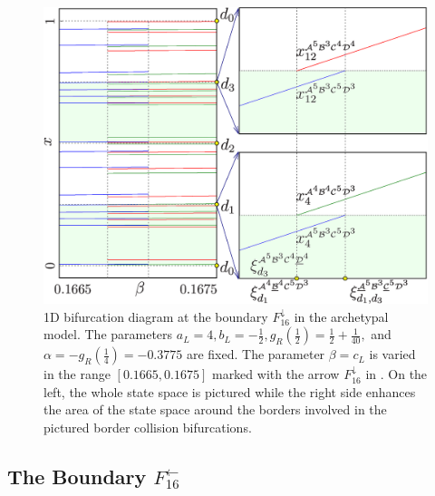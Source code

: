 \begin{figure}[H]
	\centering
	\includegraphics[width=.7 \textwidth]{../Figures/6/6.5/result.png}
	\caption[1D bifurcation diagram at the boundary $F_{16}^\downarrow$ in the archetypal model]{
		1D bifurcation diagram at the boundary $F_{16}^\downarrow$ in the archetypal model.
		The parameters $a_L = 4, b_L = -\frac{1}{2}, g_R\left(\frac{1}{2}\right) = \frac{1}{2} + \frac{1}{40},$ and $\alpha = -g_R\left(\frac{1}{4}\right) = -0.3775$ are fixed.
		The parameter $\beta = c_L$ is varied in the range $[0.1665, 0.1675]$ marked with the arrow $F_{16}^\downarrow$ in .
		On the left, the whole state space is pictured while the right side enhances the area of the state space around the borders involved in the pictured border collision bifurcations.
	}
	\label{fig:arch.bif.F.down}
\end{figure}

\subsection{The Boundary $F_{16}^\leftarrow$}
\label{sec:arch.bif.L}

